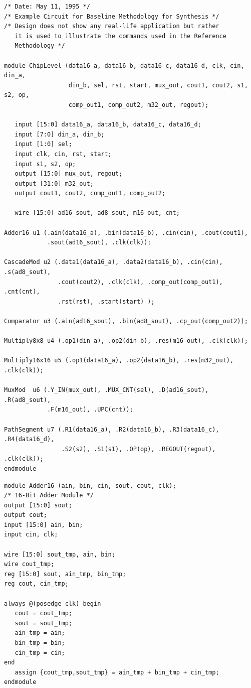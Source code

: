 \begin{lstlisting}[caption={ChipLevel.v},label=ex:chiplevel]
/* Date: May 11, 1995 */
/* Example Circuit for Baseline Methodology for Synthesis */
/* Design does not show any real-life application but rather
   it is used to illustrate the commands used in the Reference
   Methodology */

module ChipLevel (data16_a, data16_b, data16_c, data16_d, clk, cin, din_a,
                  din_b, sel, rst, start, mux_out, cout1, cout2, s1, s2, op,
                  comp_out1, comp_out2, m32_out, regout);

   input [15:0] data16_a, data16_b, data16_c, data16_d;
   input [7:0] din_a, din_b;
   input [1:0] sel;
   input clk, cin, rst, start;
   input s1, s2, op;
   output [15:0] mux_out, regout;
   output [31:0] m32_out;
   output cout1, cout2, comp_out1, comp_out2;

   wire [15:0] ad16_sout, ad8_sout, m16_out, cnt;

Adder16 u1 (.ain(data16_a), .bin(data16_b), .cin(cin), .cout(cout1),
            .sout(ad16_sout), .clk(clk));

CascadeMod u2 (.data1(data16_a), .data2(data16_b), .cin(cin), .s(ad8_sout),
               .cout(cout2), .clk(clk), .comp_out(comp_out1), .cnt(cnt),
               .rst(rst), .start(start) );

Comparator u3 (.ain(ad16_sout), .bin(ad8_sout), .cp_out(comp_out2));

Multiply8x8 u4 (.op1(din_a), .op2(din_b), .res(m16_out), .clk(clk));

Multiply16x16 u5 (.op1(data16_a), .op2(data16_b), .res(m32_out), .clk(clk));

MuxMod  u6 (.Y_IN(mux_out), .MUX_CNT(sel), .D(ad16_sout), .R(ad8_sout),
            .F(m16_out), .UPC(cnt));

PathSegment u7 (.R1(data16_a), .R2(data16_b), .R3(data16_c), .R4(data16_d),
                .S2(s2), .S1(s1), .OP(op), .REGOUT(regout), .clk(clk));
endmodule
\end{lstlisting}

\begin{lstlisting}[caption={Adder16.v},label=ex:adder16-v]
module Adder16 (ain, bin, cin, sout, cout, clk);
/* 16-Bit Adder Module */
output [15:0] sout;
output cout;
input [15:0] ain, bin;
input cin, clk;

wire [15:0] sout_tmp, ain, bin;
wire cout_tmp;
reg [15:0] sout, ain_tmp, bin_tmp;
reg cout, cin_tmp;

always @(posedge clk) begin
   cout = cout_tmp;
   sout = sout_tmp;
   ain_tmp = ain;
   bin_tmp = bin;
   cin_tmp = cin;
end
   assign {cout_tmp,sout_tmp} = ain_tmp + bin_tmp + cin_tmp;
endmodule
\end{lstlisting}

